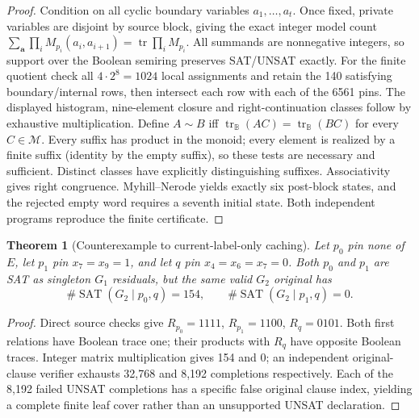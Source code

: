 \documentclass[11pt]{article}
\newtheorem{theorem}{Theorem}
\begin{document}
\begin{proof}
Condition on all cyclic boundary variables $a_1,\ldots,a_t$. Once fixed, private variables are disjoint by source block, giving the exact integer model count
$\sum_{\mathbf a}\prod_iM_{p_i}(a_i,a_{i+1})=\operatorname{tr}\prod_iM_{p_i}$.
All summands are nonnegative integers, so support over the Boolean semiring preserves SAT/UNSAT exactly. For the finite quotient check all $4\cdot2^8=1024$ local assignments and retain the 140 satisfying boundary/internal rows, then intersect each row with each of the 6561 pins. The displayed histogram, nine-element closure and right-continuation classes follow by exhaustive multiplication. Define $A\sim B$ iff $\operatorname{tr}_{\mathbb B}(AC)=\operatorname{tr}_{\mathbb B}(BC)$ for every $C\in\mathcal M$. Every suffix has product in the monoid; every element is realized by a finite suffix (identity by the empty suffix), so these tests are necessary and sufficient. Distinct classes have explicitly distinguishing suffixes. Associativity gives right congruence. Myhill--Nerode yields exactly six post-block states, and the rejected empty word requires a seventh initial state. Both independent programs reproduce the finite certificate.
\end{proof}
\begin{theorem}[Counterexample to current-label-only caching]
Let $p_0$ pin none of $E$, let $p_1$ pin $x_7=x_9=1$, and let $q$ pin $x_4=x_6=x_7=0$. Both $p_0$ and $p_1$ are SAT as singleton $G_1$ residuals, but the same valid $G_2$ original has
\[
\#\operatorname{SAT}(G_2\mid p_0,q)=154,\qquad
\#\operatorname{SAT}(G_2\mid p_1,q)=0.
\]
\end{theorem}
\begin{proof}
Direct source checks give $R_{p_0}=1111$, $R_{p_1}=1100$, $R_q=0101$. Both first relations have Boolean trace one; their products with $R_q$ have opposite Boolean traces. Integer matrix multiplication gives 154 and 0; an independent original-clause verifier exhausts 32,768 and 8,192 completions respectively. Each of the 8,192 failed UNSAT completions has a specific false original clause index, yielding a complete finite leaf cover rather than an unsupported UNSAT declaration.
\end{proof}
\end{document}
